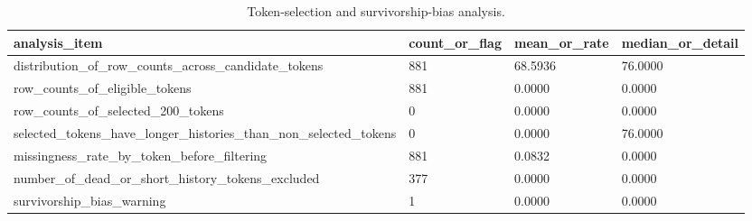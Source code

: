 \begin{table}[htbp]
\centering
\begin{tabular}{llll}
\hline
analysis_item & count_or_flag & mean_or_rate & median_or_detail \\
\hline
distribution_of_row_counts_across_candidate_tokens & 881 & 68.5936 & 76.0000 \\
row_counts_of_eligible_tokens & 881 & 0.0000 & 0.0000 \\
row_counts_of_selected_200_tokens & 0 & 0.0000 & 0.0000 \\
selected_tokens_have_longer_histories_than_non_selected_tokens & 0 & 0.0000 & 76.0000 \\
missingness_rate_by_token_before_filtering & 881 & 0.0832 & 0.0000 \\
number_of_dead_or_short_history_tokens_excluded & 377 & 0.0000 & 0.0000 \\
survivorship_bias_warning & 1 & 0.0000 & 0.0000 \\
\hline
\end{tabular}
\caption{Token-selection and survivorship-bias analysis.}
\label{table_token_selection_bias}
\end{table}